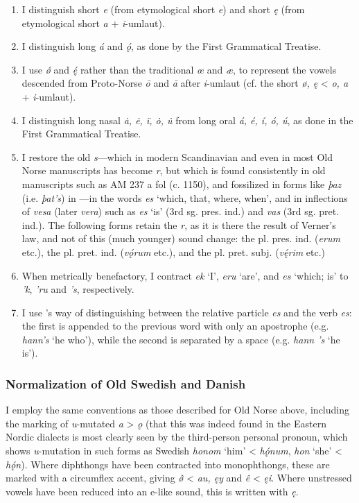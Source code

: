    \begin{enumerate}
    \item I distinguish short \emph{e} (from etymological short \emph{e}) and short \emph{ę} (from etymological short \emph{a} + \emph{i}-umlaut).
    \item I distinguish long \emph{á} and \emph{ǫ́}, as done by the First Grammatical Treatise.
    \item I use \emph{ǿ} and \emph{ę́} rather than the traditional \emph{œ} and \emph{æ}, to represent the vowels descended from Proto-Norse \emph{ō} and \emph{ā} after \emph{i}-umlaut (cf. the short \emph{ø, ę} < \emph{o, a} + \emph{i}-umlaut).
    \item I distinguish long nasal \emph{ȧ, ė, ï, ȯ, u̇} from long oral \emph{á, é, í, ó, ú}, as done in the First Grammatical Treatise.
    \item I restore the old \emph{s}—which in modern Scandinavian and even in most Old Norse manuscripts has become \emph{r}, but which is found consistently in old manuscripts such as AM 237 a fol (c. 1150), and fossilized in forms like \emph{þaz} (i.e. \emph{þat’s}) in \Regius—in the words \emph{es} ‘which, that, where, when’, and in inflections of \emph{vesa} (later \emph{vera}) such as \emph{es} ‘is’ (3rd sg. pres. ind.) and \emph{vas} (3rd sg. pret. ind.). The following forms retain the \emph{r}, as it is there the result of Verner’s law, and not of this (much younger) sound change: the pl. pres. ind. (\emph{erum} etc.), the pl. pret. ind. (\emph{vǫ́rum} etc.), and the pl. pret. subj. (\emph{vę́rim} etc.)
    \item When metrically benefactory, I contract \emph{ek} ‘I’, \emph{eru} ‘are’, and \emph{es} ‘which; is’ to \emph{’k}, \emph{’ru} and \emph{’s}, respectively.
    \item I use \textcite{FinnurEdda}’s way of distinguishing between the relative particle \emph{es} and the verb \emph{es}: the first is appended to the previous word with only an apostrophe (e.g. \emph{hann’s} ‘he who’), while the second is separated by a space (e.g. \emph{hann ’s} ‘he is’).
    \end{enumerate}

    \subsubsection{Normalization of Old Swedish and Danish}
    I employ the same conventions as those described for Old Norse above, including the marking of \emph{u}-mutated \emph{a} > \emph{ǫ} (that this was indeed found in the Eastern Nordic dialects is most clearly seen by the third-person personal pronoun, which shows \emph{u}-mutation in such forms as Swedish \emph{honom} ‘him’ < \emph{hǫ́num}, \emph{hon} ‘she’ < \emph{hǫ́n}).  Where diphthongs have been contracted into monophthongs, these are marked with a circumflex accent, giving \emph{ø̂} < \emph{au, ęy} and \emph{ê} < \emph{ęi}.  Where unstressed vowels have been reduced into an e-like sound, this is written with \emph{ę}.

